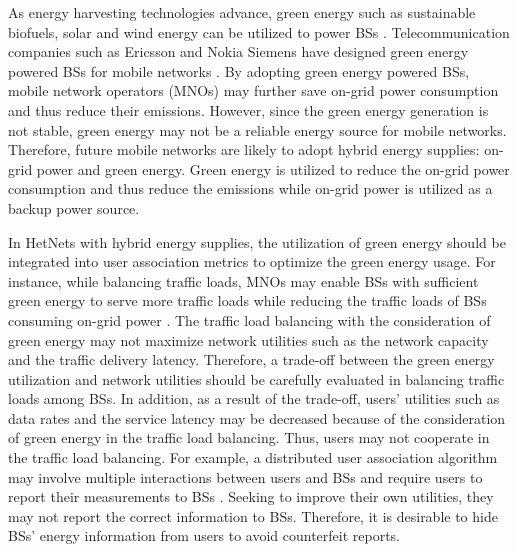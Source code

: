 \documentclass[journal]{IEEEtran}
\theoremstyle{definition}
\begin{document}
As energy harvesting technologies advance, green energy such as sustainable biofuels, solar and wind energy can be utilized to power BSs  \cite{Han:2014:PMN}. Telecommunication companies such as Ericsson and Nokia Siemens have designed green energy powered BSs for mobile networks \cite{Ericson:2007:SEU}. By adopting green energy powered BSs, mobile network operators (MNOs) may further save on-grid power consumption and thus reduce their  emissions. However, since the green energy generation is not stable, green energy may not be a reliable energy source for mobile networks. Therefore, future mobile networks are likely to adopt hybrid energy supplies: on-grid power and green energy. Green energy is utilized to reduce the on-grid power consumption and thus reduce the  emissions while on-grid power is utilized as a backup power source.

In HetNets with hybrid energy supplies, the utilization of green energy should be integrated into user association metrics to optimize the green energy usage. For instance, while balancing traffic loads, MNOs may enable BSs with sufficient green energy to serve more traffic loads while reducing the traffic loads of BSs consuming on-grid power \cite{Han:2013:OOG}. The traffic load balancing with the consideration of green energy may not maximize network utilities such as the network capacity and the traffic delivery latency. Therefore, a trade-off between the green energy utilization and network utilities should be carefully evaluated in balancing traffic loads among BSs. In addition, as a result of the trade-off, users' utilities such as data rates and the service latency may be decreased because of the consideration of green energy in the traffic load balancing. Thus, users may not cooperate in the traffic load balancing. For example, a distributed user association algorithm may involve multiple interactions between users and BSs and require users to report their measurements to BSs \cite{Ye:2013:UAL,Han:2013:GALA}. Seeking to improve their own utilities, they may not report the correct information to BSs. Therefore, it is desirable to hide BSs' energy information from users to avoid counterfeit reports.
\end{document}
